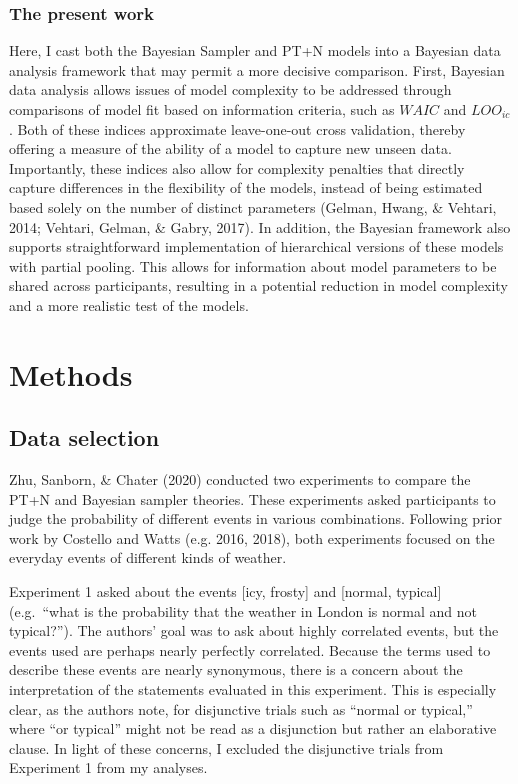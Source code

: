 \documentclass[
  english,
  man,floatsintext]{apa6}
\begin{document}
\hypertarget{the-present-work}{%
\subsubsection{The present work}\label{the-present-work}}

Here, I cast both the Bayesian Sampler and PT+N models into a Bayesian data analysis framework that may permit a more decisive comparison. First, Bayesian data analysis allows issues of model complexity to be addressed through comparisons of model fit based on information criteria, such as \(WAIC\) and \(LOO_{ic}\). Both of these indices approximate leave-one-out cross validation, thereby offering a measure of the ability of a model to capture new unseen data. Importantly, these indices also allow for complexity penalties that directly capture differences in the flexibility of the models, instead of being estimated based solely on the number of distinct parameters (Gelman, Hwang, \& Vehtari, 2014; Vehtari, Gelman, \& Gabry, 2017). In addition, the Bayesian framework also supports straightforward implementation of hierarchical versions of these models with partial pooling. This allows for information about model parameters to be shared across participants, resulting in a potential reduction in model complexity and a more realistic test of the models.

\hypertarget{methods}{%
\section{Methods}\label{methods}}

\hypertarget{data-selection}{%
\subsection{Data selection}\label{data-selection}}

Zhu, Sanborn, \& Chater (2020) conducted two experiments to compare the PT+N and Bayesian sampler theories. These experiments asked participants to judge the probability of different events in various combinations. Following prior work by Costello and Watts (e.g. 2016, 2018), both experiments focused on the everyday events of different kinds of weather.

Experiment 1 asked about the events {[}icy, frosty{]} and {[}normal, typical{]} (e.g.~``what is the probability that the weather in London is normal and not typical?''). The authors' goal was to ask about highly correlated events, but the events used are perhaps nearly perfectly correlated. Because the terms used to describe these events are nearly synonymous, there is a concern about the interpretation of the statements evaluated in this experiment. This is especially clear, as the authors note, for disjunctive trials such as ``normal or typical,'' where ``or typical'' might not be read as a disjunction but rather an elaborative clause. In light of these concerns, I excluded the disjunctive trials from Experiment 1 from my analyses.
\end{document}
